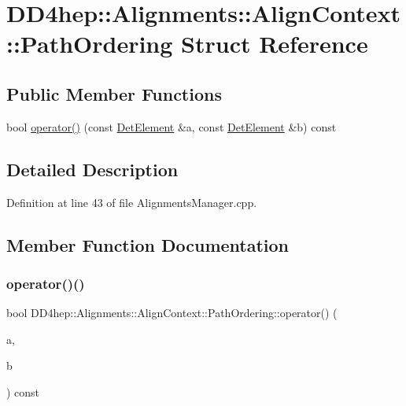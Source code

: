 \hypertarget{struct_d_d4hep_1_1_alignments_1_1_align_context_1_1_path_ordering}{}\section{D\+D4hep\+:\+:Alignments\+:\+:Align\+Context\+:\+:Path\+Ordering Struct Reference}
\label{struct_d_d4hep_1_1_alignments_1_1_align_context_1_1_path_ordering}
\subsection*{Public Member Functions}
\begin{DoxyCompactItemize}
\item 
bool \hyperlink{struct_d_d4hep_1_1_alignments_1_1_align_context_1_1_path_ordering_ac825156e2545f0ef468cdf0a50c952bc}{operator()} (const \hyperlink{class_d_d4hep_1_1_geometry_1_1_det_element}{Det\+Element} \&a, const \hyperlink{class_d_d4hep_1_1_geometry_1_1_det_element}{Det\+Element} \&b) const
\end{DoxyCompactItemize}


\subsection{Detailed Description}


Definition at line 43 of file Alignments\+Manager.\+cpp.



\subsection{Member Function Documentation}
\hypertarget{struct_d_d4hep_1_1_alignments_1_1_align_context_1_1_path_ordering_ac825156e2545f0ef468cdf0a50c952bc}{}\label{struct_d_d4hep_1_1_alignments_1_1_align_context_1_1_path_ordering_ac825156e2545f0ef468cdf0a50c952bc} 
\subsubsection{\texorpdfstring{operator()()}{operator()()}}
{\footnotesize\ttfamily bool D\+D4hep\+::\+Alignments\+::\+Align\+Context\+::\+Path\+Ordering\+::operator() (\begin{DoxyParamCaption}\item[{const \hyperlink{class_d_d4hep_1_1_geometry_1_1_det_element}{Det\+Element} \&}]{a,  }\item[{const \hyperlink{class_d_d4hep_1_1_geometry_1_1_det_element}{Det\+Element} \&}]{b }\end{DoxyParamCaption}) const\hspace{0.3cm}{\ttfamily [inline]}}



